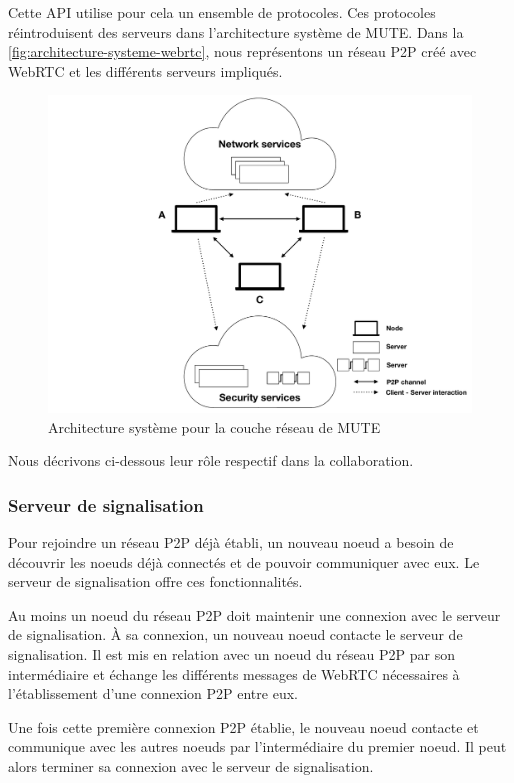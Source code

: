 \documentclass[12pt]{thesul}
\begin{document}
Cette API utilise pour cela un ensemble de protocoles.
Ces protocoles réintroduisent des serveurs dans l'architecture système de MUTE.
Dans la \autoref{fig:architecture-systeme-webrtc}, nous représentons un réseau \ac{P2P} créé avec \ac{WebRTC} et les différents serveurs impliqués.

\begin{figure}[!ht]
  \centering
  \includegraphics[page=3, trim=7cm 3cm 4cm 2cm, clip, width=.7\linewidth]{img/mute-figures.pdf}
  \caption{Architecture système pour la couche réseau de MUTE}
  \label{fig:architecture-systeme-webrtc}
\end{figure}

Nous décrivons ci-dessous leur rôle respectif dans la collaboration.

\subsubsection{Serveur de signalisation}

Pour rejoindre un réseau \ac{P2P} déjà établi, un nouveau noeud a besoin de découvrir les noeuds déjà connectés et de pouvoir communiquer avec eux.
Le serveur de signalisation offre ces fonctionnalités.

Au moins un noeud du réseau \ac{P2P} doit maintenir une connexion avec le serveur de signalisation.
À sa connexion, un nouveau noeud contacte le serveur de signalisation.
Il est mis en relation avec un noeud du réseau \ac{P2P} par son intermédiaire et échange les différents messages de \ac{WebRTC} nécessaires à l'établissement d'une connexion \ac{P2P} entre eux.

Une fois cette première connexion \ac{P2P} établie, le nouveau noeud contacte et communique avec les autres noeuds par l'intermédiaire du premier noeud.
Il peut alors terminer sa connexion avec le serveur de signalisation.
\end{document}
